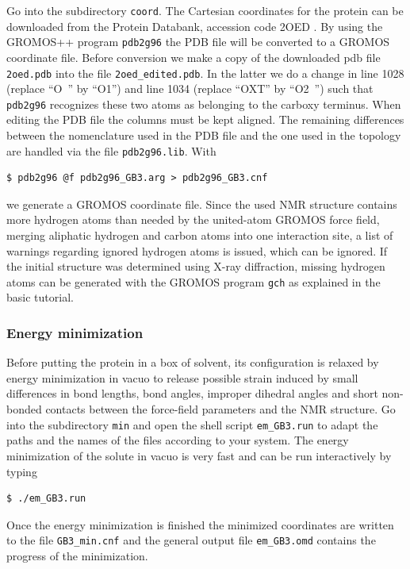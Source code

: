 Go into the subdirectory \texttt{coord}. The Cartesian coordinates for the protein can be downloaded from the Protein Databank, accession code 2OED \cite{Ulmer_2003}. By using the GROMOS++ program \texttt{pdb2g96} the PDB file will be converted to a GROMOS coordinate file. Before conversion we make a copy of the downloaded pdb file \texttt{2oed.pdb} into the file \texttt{2oed\_edited.pdb}. In the latter we do a change in line 1028 (replace “O~” by “O1”) and line 1034 (replace “OXT” by “O2~”) such that \texttt{pdb2g96} recognizes these two atoms as belonging to the carboxy terminus. When editing the PDB file the columns must be kept aligned. The remaining differences between the nomenclature used in the PDB file and the one used in the topology are handled via the file \texttt{pdb2g96.lib}. With
\begin{lstlisting}
$ pdb2g96 @f pdb2g96_GB3.arg > pdb2g96_GB3.cnf
\end{lstlisting}
we generate a GROMOS coordinate file. 
Since the used NMR structure contains more hydrogen atoms than needed by the united-atom GROMOS force field, merging aliphatic hydrogen and carbon atoms into one interaction site, 
a list of warnings regarding ignored hydrogen atoms is issued, which can be ignored. If the initial structure was determined using X-ray diffraction, missing hydrogen atoms can be generated 
with the GROMOS program \texttt{gch} as explained in the basic tutorial.

\subsubsection{Energy minimization}

Before putting the protein in a box of solvent, its configuration is relaxed by energy minimization 
in vacuo to release possible strain induced by small differences in bond lengths, bond angles, improper dihedral angles and short non-bonded contacts 
between the force-field parameters and the NMR structure.
Go into the subdirectory \texttt{min} and open the shell script \texttt{em\_GB3.run} to adapt the paths and the names of the files according to your system. 
The energy minimization of the solute in vacuo is very fast and can be run interactively by typing
\begin{lstlisting}
$ ./em_GB3.run
\end{lstlisting}
Once the energy minimization is finished the minimized coordinates are written to the file \texttt{GB3\_min.cnf} and the general output file \texttt{em\_GB3.omd} contains the progress of the minimization.

